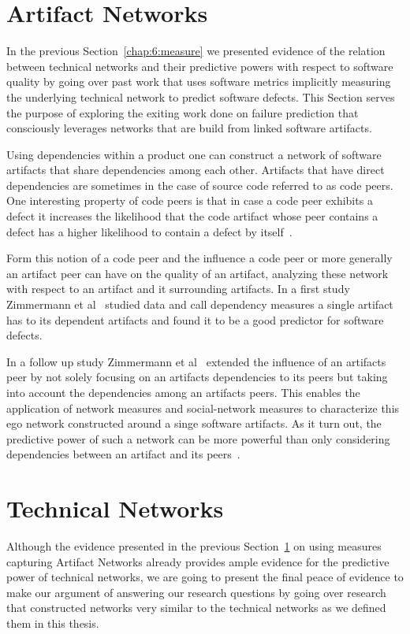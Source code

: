 \section{Artifact Networks}
\label{chap:6:an}
In the previous Section~\ref{chap:6:measure} we presented evidence of the relation between technical networks and their predictive powers with respect to software quality by going over past work that uses software metrics implicitly measuring the underlying technical network to predict software defects.
This Section serves the purpose of exploring the exiting work done on failure prediction that consciously leverages networks that are build from linked software artifacts.

Using dependencies within a product one can construct a network of software artifacts that share dependencies among each other.
Artifacts that have direct dependencies are sometimes in the case of source code referred to as code peers.
One interesting property of code peers is that in case a code peer exhibits a defect it increases the likelihood that the code artifact whose peer contains a defect has a higher likelihood to contain a defect by itself~\cite{nguyen:icse:2010}.

Form this notion of a code peer and the influence a code peer or more generally an artifact peer can have on the quality of an artifact, analyzing these network with respect to an artifact and it surrounding artifacts.
In a first study Zimmermann et al~\cite{zimmermann:icse:2008} studied data and call dependency measures a single artifact has to its dependent artifacts and found it to be a good predictor for software defects.

In a follow up study Zimmermann et al~\cite{zimmermann:esem:2009} extended the influence of an artifacts peer by not solely focusing on an artifacts dependencies to its peers but taking into account the dependencies among an artifacts peers.
This enables the application of network measures and social-network measures to characterize this ego network constructed around a singe software artifacts.
As it turn out, the predictive power of such a network can be more powerful than only considering dependencies between an artifact and its peers~\cite{zimmermann:esem:2009}.

\section{Technical Networks}
\label{chap:6:tn}
Although the evidence presented in the previous Section~\ref{chap:6:an} on using measures capturing Artifact Networks already provides ample evidence for the predictive power of technical networks, we are going to present the final peace of evidence to make our argument of answering our research questions by going over research that constructed networks very similar to the technical networks as we defined them in this thesis.

